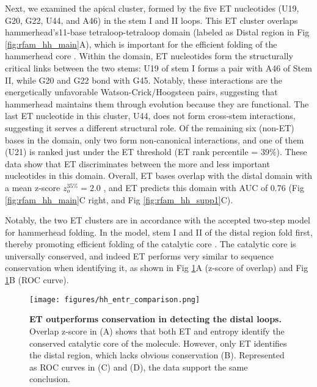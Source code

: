 \documentclass[12pt,a4paper]{report}
\begin{document}
Next, we examined the apical cluster, formed by the five ET nucleotides (U19, G20, G22, U44, and A46) in the stem I and II loops. This ET cluster overlaps hammerhead’s11-base tetraloop-tetraloop domain (labeled as Distal region in Fig \ref{fig:rfam_hh_main}A), which is important for the efficient folding of the hammerhead core \cite{Khvorova2003}. Within the domain, ET nucleotides form the structurally critical links between the two stems: U19 of stem I forms a pair with A46 of Stem II, while G20 and G22 bond with G45. Notably, these interactions are the energetically unfavorable Watson-Crick/Hoogsteen pairs, suggesting that hammerhead maintains them through evolution because they are functional. The last ET nucleotide in this cluster, U44, does not form cross-stem interactions, suggesting it serves a different structural role. Of the remaining six (non-ET) bases in the domain, only two form non-canonical interactions, and one of them (U21) is ranked just under the ET threshold (ET rank percentile = 39\%). These data show that ET discriminates between the more and less important nucleotides in this domain. Overall, ET bases overlap with the distal domain with a mean z-score $z_{o}^{35\%}=2.0$ , and ET predicts this domain with AUC of 0.76 (Fig \ref{fig:rfam_hh_main}C right, and Fig \ref{fig:rfam_hh_supp1}C).

Notably, the two ET clusters are in accordance with the accepted two-step model for hammerhead folding. In the model, stem I and II of the distal region fold first, thereby promoting efficient folding of the catalytic core \cite{Hammann2001}. The catalytic core is universally conserved, and indeed ET performs very similar to sequence conservation when identifying it, as shown in Fig \ref{fig:rfam_hh_supp2}A (z-score of overlap) and Fig \ref{fig:rfam_hh_supp2}B (ROC curve).

\begin{figure}
\begin{minipage}[c][\textheight]{\textwidth}
\centering
  \texttt{[image: figures/hh\_entr\_comparison.png]} %
  \caption[ET outperforms conservation in detecting the distal loops.]{\textbf{ET outperforms conservation in detecting the distal loops.} Overlap z-score in (A) shows that both ET and entropy identify the conserved catalytic core of the molecule. However, only ET identifies the distal region, which lacks obvious conservation (B). Represented as ROC curves in (C) and (D), the data support the same conclusion.}
  \label{fig:rfam_hh_supp2}
  \end{minipage}
\end{figure}
\end{document}
